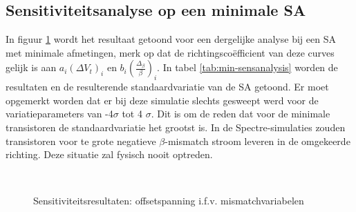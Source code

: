 \subsection{Sensitiviteitsanalyse op een minimale SA}
In figuur \ref{fig:min-sensanalysis} wordt het resultaat getoond voor een dergelijke analyse bij een SA met minimale afmetingen, merk op dat de richtingscoëfficient van deze curves gelijk is aan $a_{i} (\Delta V_{t})_{i}$ en $b_{i} (\frac{\Delta_{\beta}}{\beta})_{i}$.  In tabel \ref{tab:min-sensanalysis} worden de resultaten en de resulterende standaardvariatie van de SA getoond.
Er moet opgemerkt worden dat er bij deze simulatie slechts gesweept werd voor de variatieparameters van -4$\sigma$ tot 4 $\sigma$. Dit is om de reden dat voor de minimale transistoren de standaardvariatie het grootst is. In de Spectre-simulaties zouden transistoren voor te grote negatieve $\beta$-mismatch stroom leveren in de omgekeerde richting. Deze situatie zal fysisch nooit optreden.

\begin{figure}[!ht]
\centering
{} \\

\caption{Sensitiviteitsresultaten: offsetspanning i.f.v. mismatchvariabelen}
\label{fig:min-sensanalysis}
\end{figure}


